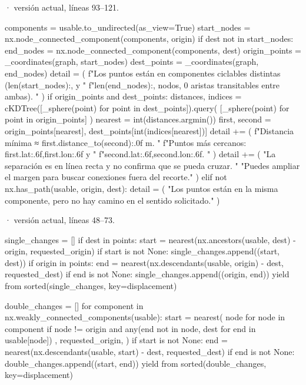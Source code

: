 \documentclass[11pt,a4paper]{article}
\begin{document}
\smallskip
{\footnotesize\texttt{} · versión actual, líneas 93--121.}\par
\begin{Codigo}[firstnumber=93]
    components = usable.to_undirected(as_view=True)
    start_nodes = nx.node_connected_component(components, origin)
    if dest not in start_nodes:
        end_nodes = nx.node_connected_component(components, dest)
        origin_points = _coordinates(graph, start_nodes)
        dest_points = _coordinates(graph, end_nodes)
        detail = (
            f"Los puntos están en componentes ciclables distintas ({len(start_nodes):,} y "
            f"{len(end_nodes):,} nodos, 0 aristas transitables entre ambas). "
        )
        if origin_points and dest_points:
            distances, indices = cKDTree([_sphere(point) for point in dest_points]).query(
                [_sphere(point) for point in origin_points]
            )
            nearest = int(distances.argmin())
            first, second = origin_points[nearest], dest_points[int(indices[nearest])]
            detail += (
                f"Distancia mínima ≈ {first.distance_to(second):.0f} m. "
                f"Puntos más cercanos: {first.lat:.6f},{first.lon:.6f} y "
                f"{second.lat:.6f},{second.lon:.6f}. "
            )
        detail += (
            "La separación es en línea recta y no confirma que se pueda cruzar. "
            "Puedes ampliar el margen para buscar conexiones fuera del recorte."
        )
    elif not nx.has_path(usable, origin, dest):
        detail = (
            "Los puntos están en la misma componente, pero no hay camino en el sentido solicitado."
        )
\end{Codigo}

\smallskip
{\footnotesize\texttt{} · versión actual, líneas 48--73.}\par
\begin{Codigo}[firstnumber=48]
    single_changes = []
    if dest in points:
        start = nearest(nx.ancestors(usable, dest) - {origin}, requested_origin)
        if start is not None:
            single_changes.append((start, dest))
    if origin in points:
        end = nearest(nx.descendants(usable, origin) - {dest}, requested_dest)
        if end is not None:
            single_changes.append((origin, end))
    yield from sorted(single_changes, key=displacement)

    double_changes = []
    for component in nx.weakly_connected_components(usable):
        start = nearest(
            {
                node
                for node in component
                if node != origin and any(end not in {node, dest} for end in usable[node])
            },
            requested_origin,
        )
        if start is not None:
            end = nearest(nx.descendants(usable, start) - {dest}, requested_dest)
            if end is not None:
                double_changes.append((start, end))
    yield from sorted(double_changes, key=displacement)
\end{Codigo}
\end{document}
